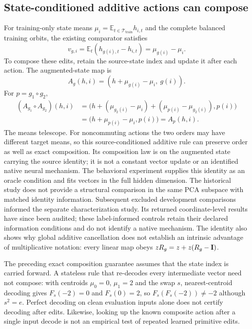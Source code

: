 \subsection{State-conditioned additive actions can compose}
\label{app:additive-composition}
For training-only state means $\mu_i=\mathbb{E}_{t\in\mathcal T_{\mathrm{train}}}h_{i,t}$ and the complete balanced training orbits, the existing comparator satisfies
\[
 v_{g,i}=\mathbb{E}_t(h_{g(i),t}-h_{i,t})=\mu_{g(i)}-\mu_i.
\]
To compose these edits, retain the source-state index and update it after each action. The augmented-state map is
\[
 A_g(h,i)=(h+\mu_{g(i)}-\mu_i,\ g(i)).
\]
For $p=g_1\circ g_2$,
\begin{align*}
 (A_{g_1}\circ A_{g_2})(h,i)
 &=\bigl(h+(\mu_{g_2(i)}-\mu_i)
             +(\mu_{p(i)}-\mu_{g_2(i)}),p(i)\bigr)\\
 &=\bigl(h+\mu_{p(i)}-\mu_i,p(i)\bigr)=A_p(h,i).
\end{align*}
The means telescope. For noncommuting actions the two orders may have different target means, so this source-conditioned additive rule can preserve order as well as exact composition. Its composition law is on the augmented state carrying the source identity; it is not a constant vector update or an identified native neural mechanism. The behavioral experiment supplies this identity as an oracle condition and fits vectors in the full hidden dimension. The historical study does not provide a structural comparison in the same PCA subspace with matched identity information. Subsequent excluded development comparisons informed the separate characterization study. Its returned coordinate-level results have since been audited; these label-informed controls retain their declared information conditions and do not identify a native mechanism. The identity also shows why global additive cancellation does not establish an intrinsic advantage of multiplicative notation: every linear map obeys $zR_g=z+z(R_g-\mathbf{I})$.

The preceding exact composition guarantee assumes that the state index is carried forward. A stateless rule that re-decodes every intermediate vector need not compose: with centroids $\mu_0=0$, $\mu_1=2$ and the swap $s$, nearest-centroid decoding gives $F_s(-2)=0$ and $F_s(0)=2$, so $F_s(F_s(-2))\ne-2$ although $s^2=e$. Perfect decoding on clean evaluation inputs alone does not certify decoding after edits. Likewise, looking up the known composite action after a single input decode is not an empirical test of repeated learned primitive edits.

